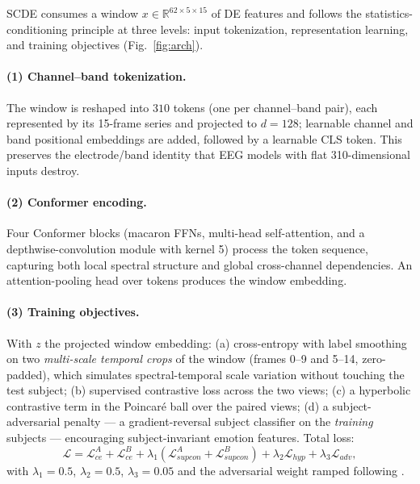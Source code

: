 \documentclass{article}
\newcommand{\method}{SCDE}
\begin{document}
\method{} consumes a window $x \in \mathbb{R}^{62 \times 5 \times 15}$ of
DE features and follows the statistics-conditioning principle at three
levels: input tokenization, representation learning, and training
objectives (Fig.~\ref{fig:arch}).

\paragraph{(1) Channel--band tokenization.} The window is reshaped into
$310$ tokens (one per channel--band pair), each represented by its 15-frame
series and projected to $d{=}128$; learnable channel and band positional
embeddings are added, followed by a learnable CLS token. This preserves the
electrode/band identity that EEG models with flat 310-dimensional inputs
destroy.

\paragraph{(2) Conformer encoding.} Four Conformer blocks
\citep{gulati2020conformer} (macaron FFNs, multi-head self-attention, and a
depthwise-convolution module with kernel 5) process the token sequence,
capturing both local spectral structure and global cross-channel
dependencies. An attention-pooling head over tokens produces the window
embedding.

\paragraph{(3) Training objectives.} With $z$ the projected window
embedding: (a) cross-entropy with label smoothing on two \emph{multi-scale
temporal crops} of the window (frames 0--9 and 5--14, zero-padded), which
simulates spectral-temporal scale variation without touching the test
subject; (b) supervised contrastive loss \citep{khosla2020supcon} across
the two views; (c) a hyperbolic contrastive term in the Poincar\'e ball
\citep{chang2025mshcl} over the paired views; (d) a subject-adversarial
penalty \citep{ganin2016dann} --- a gradient-reversal subject classifier on
the \emph{training} subjects --- encouraging subject-invariant emotion
features. Total loss:
\begin{equation}
\mathcal{L} = \mathcal{L}_{ce}^{A} + \mathcal{L}_{ce}^{B}
+ \lambda_{1}(\mathcal{L}_{supcon}^{A} + \mathcal{L}_{supcon}^{B})
+ \lambda_{2}\mathcal{L}_{hyp}
+ \lambda_{3}\mathcal{L}_{adv},
\end{equation}
with $\lambda_{1}{=}0.5$, $\lambda_{2}{=}0.5$, $\lambda_{3}{=}0.05$ and the
adversarial weight ramped following \citep{ganin2016dann}.
\end{document}
